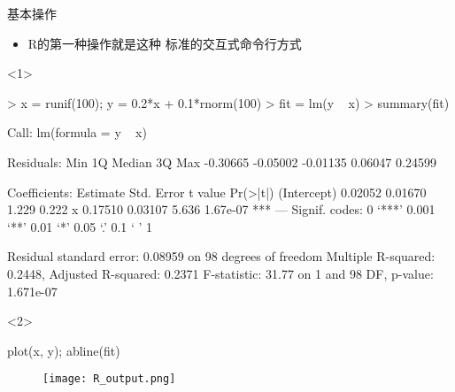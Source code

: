 \begin{frame}[t, fragile]{\subsecname}{基本操作}
\begin{itemize}
  \item R的第一种操作就是这种
             标准的交互式命令行方式  
\end{itemize} 

\begin{overlayarea}{\textwidth}{\textheight}
\begin{onlyenv}<1>
\begin{rcode}
> x = runif(100); y = 0.2*x + 0.1*rnorm(100)
> fit = lm(y ~ x)
> summary(fit)

Call:
lm(formula = y ~ x)

Residuals:
     Min       1Q   Median       3Q      Max 
-0.30665 -0.05002 -0.01135  0.06047  0.24599 

Coefficients:
            Estimate Std. Error t value Pr(>|t|)    
(Intercept)  0.02052    0.01670   1.229    0.222    
x            0.17510    0.03107   5.636 1.67e-07 ***
---
Signif. codes:  0 ‘***’ 0.001 ‘**’ 0.01 ‘*’ 0.05 ‘.’ 0.1 ‘ ’ 1

Residual standard error: 0.08959 on 98 degrees of freedom
Multiple R-squared:  0.2448,    Adjusted R-squared:  0.2371 
F-statistic: 31.77 on 1 and 98 DF,  p-value: 1.671e-07
\end{rcode}
\end{onlyenv}

\begin{onlyenv}<2>
\begin{rcode}
plot(x, y); abline(fit)
\end{rcode}
\begin{figure}
    \centering
    \texttt{[image: R\_output.png]}
\end{figure}
\end{onlyenv}
\end{overlayarea}
\end{frame}


